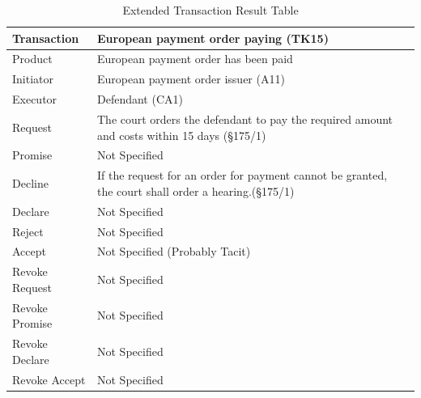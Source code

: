 \begin{landscape}
\begin{table}[h]
\caption{Extended Transaction Result Table}
\label{tab:etrt}
\begin{tabular}{|l||l|l|}
\hline
Transaction  &  European payment order paying (TK15) \\ \hline
Product      &  European payment order has been paid \\ \hline
Initiator      &  European payment order issuer (A11) \\ \hline
Executor       &  Defendant (CA1) \\ \hline
Request        &   The court orders the defendant to pay the required amount and costs within 15 days  (\S175/1)
  \\ \hline
Promise        &    Not Specified   \\ \hline
Decline        &  If the request for an order for payment cannot be granted, the court shall order a hearing.(\S175/1)  \\ \hline
Declare        &  Not Specified  \\ \hline
Reject         &  Not Specified   \\ \hline
Accept         & Not Specified (Probably Tacit) \\ \hline
Revoke Request & Not Specified      \\ \hline
Revoke Promise & Not Specified  \\ \hline
Revoke Declare & Not Specified      \\ \hline
Revoke Accept  &  Not Specified \\ \hline
\end{tabular}
\end{table}


\end{landscape}
